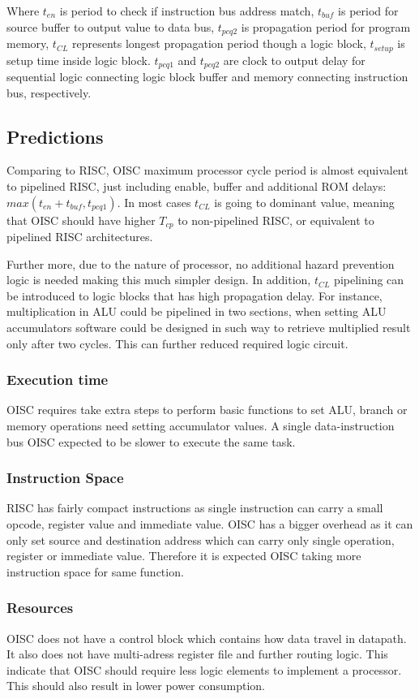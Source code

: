 Where $t_{en}$ is period to check if instruction bus address match, $t_{buf}$ is period for source buffer to output value to data bus, $t_{pcq2}$ is propagation period for program memory, $t_{CL}$ represents longest propagation period though a logic block, $t_{setup}$ is setup time inside logic block. $t_{pcq1}$ and $t_{pcq2}$ are clock to output delay for sequential logic connecting logic block buffer and memory connecting instruction bus, respectively. 

\subsection{Predictions}

Comparing to RISC, OISC maximum processor cycle period is almost equivalent to pipelined RISC, just including 
enable, buffer and additional ROM delays: $max \left( t_{en} + t_{buf}, t_{pcq1}\right)$. In most cases $t_{CL}$ is going to dominant value, meaning that OISC should have higher $T_{cp}$ to non-pipelined RISC, or equivalent to pipelined RISC architectures. 

Further more, due to the nature of processor, no additional hazard prevention logic is needed making this much simpler design. In addition, $t_{CL}$ pipelining can be introduced to logic blocks that has high propagation delay. For instance, multiplication in ALU could be pipelined in two sections, when setting ALU accumulators software could be designed in such way to retrieve multiplied result only after two cycles. This can further reduced required logic circuit.

\subsubsection{Execution time}
OISC requires take extra steps to perform basic functions to set ALU, branch or memory operations need setting accumulator values. A single data-instruction bus OISC expected to be slower to execute the same task. 

\subsubsection{Instruction Space}
RISC has fairly compact instructions as single instruction can carry a small opcode, register value and immediate value. OISC has a bigger overhead as it can only set source and destination address which can carry only single operation, register or immediate value. Therefore it is expected OISC taking more instruction space for same function.

\subsubsection{Resources}
OISC does not have a control block which contains how data travel in datapath. It also does not have multi-adress register file and further routing logic. This indicate that OISC should require less logic elements to implement a processor. This should also result in lower power consumption. 

